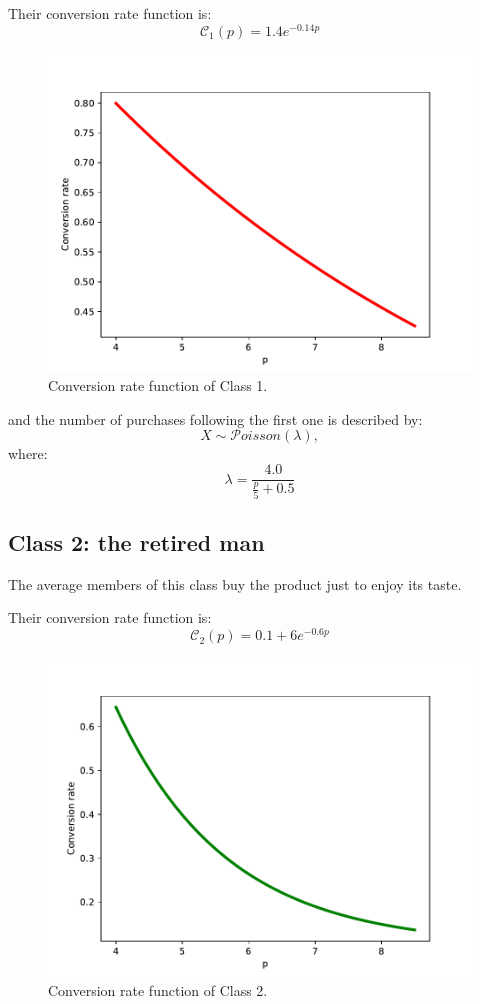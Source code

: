 \documentclass[12pt,a4paper]{report}
\begin{document}
Their conversion rate function is: 
\[ \mathcal C_1(p) =  1.4 e^{-0.14p}\]
\begin{figure}[H]
\centering
  \includegraphics[scale = 0.8, center]{C1}
  \caption{Conversion rate function of Class 1.}
\end{figure}

and the number of purchases following the first one is described by: 
\[X \sim  \mathcal{P}oisson   (\lambda),\] where:
\[\lambda = \frac{4.0}{\frac p 5 +0.5}  \]

			\subsection{Class 2: the retired man}
The average members of this class buy the product just to enjoy its taste.

Their conversion rate function is: 
\[ \mathcal C_2(p) = 0.1+ 6 e^{-0.6p}\]
\begin{figure}[H]
\centering
  \includegraphics[scale = 0.8, center]{C2}
  \caption{Conversion rate function of Class 2.}
\end{figure}
\end{document}
